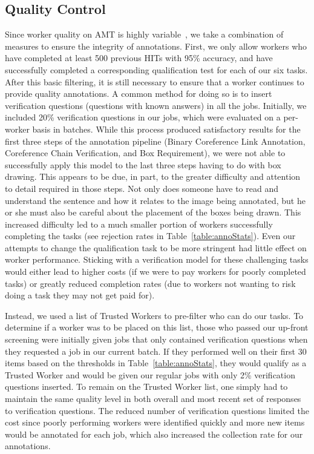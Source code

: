 \documentclass[twocolumn]{svjour3}
\begin{document}
\subsection{Quality Control} 
\label{sec:quality}
Since worker quality on AMT is highly variable~\citep{sorokin2008utility,rashtchian2010collecting}, we take a combination of measures to ensure the integrity of annotations. First, we only allow workers who have completed at least 500 previous HITs with 95\%  accuracy, and have successfully completed a corresponding qualification test for each of our six tasks.  After this basic filtering, it is still necessary to ensure that a worker continues to provide quality annotations. A common method for doing so is to insert verification questions (questions with known answers) in all the jobs.  Initially, we included 20\% verification questions in our jobs, which were evaluated on a per-worker basis in batches.  While this process produced satisfactory results for the first three steps of the annotation pipeline (Binary Coreference Link Annotation, Coreference Chain Verification, and Box Requirement), we were not able to successfully apply this model to the last three steps having to do with box drawing. This appears to be due, in part, to the greater difficulty and attention to detail required in those steps.  Not only does someone have to read and understand the sentence and how it relates to the image being annotated, but he or she must also be careful about the placement of the boxes being drawn.  This increased difficulty led to a much smaller portion of workers successfully completing the tasks (see rejection rates in Table~\ref{table:annoStats}).  Even our attempts to change the qualification task to be more stringent had little effect on worker performance. Sticking with a verification model for these challenging tasks would either lead to higher costs (if we were to pay workers for poorly completed tasks) or greatly reduced completion rates (due to workers not wanting to risk doing a task they may not get paid for).

Instead, we used a list of Trusted Workers to pre-filter who can do our tasks.  To determine if a worker was to be placed on this list, those who passed our up-front screening were initially given jobs that only contained verification questions when they requested a job in our current batch.  If they performed well on their first 30 items based on the thresholds in Table~\ref{table:annoStats}, they would qualify as a Trusted Worker and would be given our regular jobs with only 2\% verification questions inserted.  To remain on the Trusted Worker list, one simply had to maintain the same quality level in both overall and most recent set of responses to verification questions.  The reduced number of verification questions limited the cost since poorly performing workers were identified quickly and more new items would be annotated for each job, which also increased the collection rate for our annotations.
\end{document}
